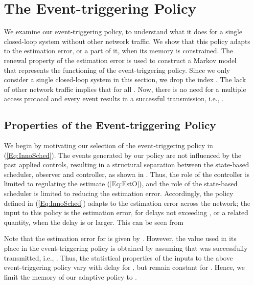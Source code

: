 \documentclass[journal]{IEEEtran}
\begin{document}
\section{The Event-triggering Policy} \label{S:ETprop}

We examine our event-triggering policy, to understand what it does for a single closed-loop system without other network traffic. We show that this policy adapts to the estimation error, or a part of it, when its memory is constrained. The renewal property of the estimation error is used to construct a Markov model that represents the functioning of the event-triggering policy. Since we only consider a single closed-loop system in this section, we drop the index . The lack of other network traffic implies that  for all . Now, there is no need for a multiple access protocol and every event results in a successful transmission, i.e., .

\subsection{Properties of the Event-triggering Policy}
We begin by motivating our selection of the event-triggering policy in (\ref{Eq:InnoSched}). The events generated by our policy are not influenced by the past applied controls, resulting in a structural separation between the state-based scheduler, observer and controller, as shown in \cite{Ramesh2013}. Thus, the role of the controller is limited to regulating the estimate (\ref{Eq:EstO}), and the role of the state-based scheduler is limited to reducing the estimation error. Accordingly, the policy defined in (\ref{Eq:InnoSched}) adapts to the estimation error across the network; the input to this policy is the estimation error, for delays not exceeding , or a related quantity, when the delay is  or larger. This can be seen from

Note that the estimation error for  is given by . However, the value used in its place in the event-triggering policy is obtained by assuming that  was successfully transmitted, i.e., . Thus, the statistical properties of the inputs to the above event-triggering policy vary with delay for , but remain constant for . Hence, we limit the memory of our adaptive policy to .
\end{document}

